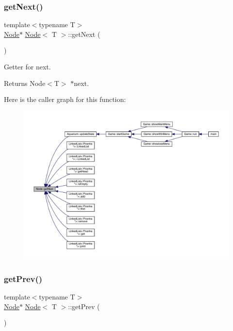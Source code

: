 \subsubsection{\texorpdfstring{get\+Next()}{getNext()}}
{\footnotesize\ttfamily template$<$typename T$>$ \\
\mbox{\hyperlink{class_node}{Node}}$\ast$ \mbox{\hyperlink{class_node}{Node}}$<$ T $>$\+::get\+Next (\begin{DoxyParamCaption}{ }\end{DoxyParamCaption})\hspace{0.3cm}{\ttfamily [inline]}}



Getter for next. 

\begin{DoxyReturn}{Returns}
Node$<$\+T$>$ $\ast$next. 
\end{DoxyReturn}
Here is the caller graph for this function\+:
\nopagebreak
\begin{figure}[H]
\begin{center}
\leavevmode
\includegraphics[width=350pt]{class_node_aaf2b6c875d0972479da9a26fca47db54_icgraph}
\end{center}
\end{figure}
\mbox{\label{class_node_ac19243714fdd3b932dfc4de33f87f158}} 
\subsubsection{\texorpdfstring{get\+Prev()}{getPrev()}}
{\footnotesize\ttfamily template$<$typename T$>$ \\
\mbox{\hyperlink{class_node}{Node}}$\ast$ \mbox{\hyperlink{class_node}{Node}}$<$ T $>$\+::get\+Prev (\begin{DoxyParamCaption}{ }\end{DoxyParamCaption})\hspace{0.3cm}{\ttfamily [inline]}}



